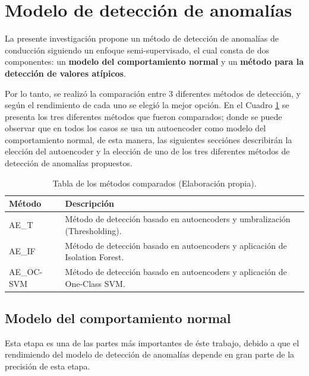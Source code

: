 \section{Modelo de detecci\'{o}n de anomal\'{i}as}

La presente investigaci\'{o}n propone un m\'{e}todo de detecci\'{o}n de anomal\'{i}as de conducci\'{o}n siguiendo un enfoque semi-supervisado, el cual consta de dos componentes: un \textbf{modelo del comportamiento normal} y un \textbf{m\'{e}todo para la detecci\'{o}n de valores at\'{i}picos}.

\vspace{5mm} %

Por lo tanto, se realiz\'{o} la comparaci\'{o}n entre 3 diferentes m\'{e}todos de detecci\'{o}n, y seg\'{u}n el rendimiento de cada uno se elegi\'{o} la mejor opci\'{o}n. En el Cuadro \ref{table:metodos_comparados} se presenta los tres diferentes m\'{e}todos que fueron comparados; donde se puede observar que en todos los casos se usa un autoencoder como modelo del comportamiento normal, de esta manera, las siguientes secci\'{o}nes describir\'{a}n la elecci\'{o}n del autoencoder y la elecci\'{o}n de uno de los tres diferentes m\'{e}todos de detecci\'{o}n de anomal\'{i}as propuestos.

\begin{table}[H]
\centering
\begin{tabular}{|l|p{100mm}|}
\hline
\textbf{M\'{e}todo} & \textbf{Descripci\'{o}n} \\ \hline
AE\_T & M\'{e}todo de detecci\'{o}n basado en autoencoders y umbralizaci\'{o}n (Thresholding). \\ \hline
AE\_IF & M\'{e}todo de detecci\'{o}n basado en autoencoders y aplicaci\'{o}n de Isolation Forest.  \\ \hline
AE\_OC-SVM & M\'{e}todo de detecci\'{o}n basado en autoencoders y aplicaci\'{o}n de One-Class SVM. \\ \hline
\end{tabular}
\caption{Tabla de los m\'{e}todos comparados (Elaboraci\'{o}n propia).}
\label{table:metodos_comparados}
\end{table}

\subsection{Modelo del comportamiento normal}

Esta etapa es una de las partes m\'{a}s importantes de \'{e}ste trabajo, debido a que el rendimiendo del modelo de detecci\'{o}n de anomal\'{i}as depende en gran parte de la precisi\'{o}n de esta etapa.

